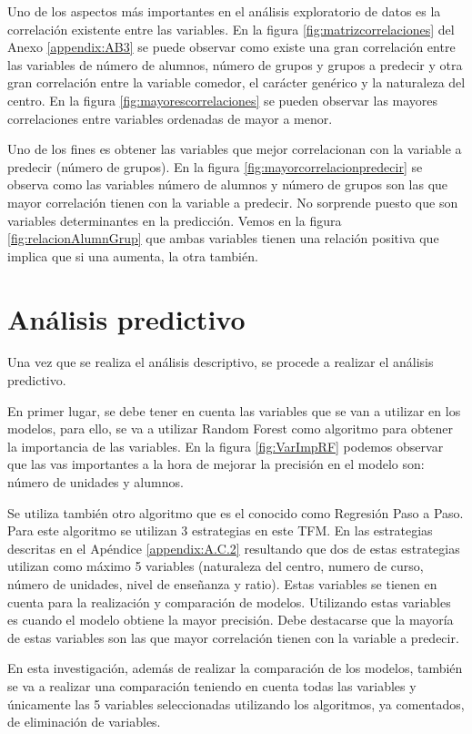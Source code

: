 Uno de los aspectos más importantes en el análisis exploratorio de datos es la correlación existente entre las variables. En la figura \ref{fig:matrizcorrelaciones} del Anexo \ref{appendix:AB3} se puede observar como existe una gran correlación entre las variables de número de alumnos, número de grupos y grupos a predecir y otra gran correlación entre la variable comedor, el carácter genérico y la naturaleza del centro. En la figura \ref{fig:mayorescorrelaciones} se pueden observar las mayores correlaciones entre variables ordenadas de mayor a menor.

Uno de los fines es obtener las variables que mejor correlacionan con la variable a predecir (número de grupos). En la figura \ref{fig:mayorcorrelacionpredecir} se observa como las variables número de alumnos y número de grupos son las que mayor correlación tienen con la variable a predecir. No sorprende puesto que son variables determinantes en la predicción. Vemos en la figura \ref{fig:relacionAlumnGrup} que ambas variables tienen una relación positiva que implica que si una aumenta, la otra también.


\section{Análisis predictivo}
Una vez que se realiza el análisis descriptivo, se procede a realizar el análisis predictivo.

En primer lugar, se debe tener en cuenta las variables que se van a utilizar en los modelos, para ello, se va a utilizar Random Forest como algoritmo para obtener la importancia de las variables. En la figura \ref{fig:VarImpRF} podemos observar que las vas importantes a la hora de mejorar la precisión en el modelo son: número de unidades y alumnos.

Se utiliza también otro algoritmo que es el conocido como Regresión Paso a Paso. Para este algoritmo se utilizan 3 estrategias en este TFM. En las estrategias descritas en el Apéndice \ref{appendix:A.C.2} resultando que dos de estas estrategias utilizan como máximo 5 variables (naturaleza del centro, numero de curso, número de unidades, nivel de enseñanza y ratio). Estas variables se tienen en cuenta para la realización y comparación de modelos. Utilizando estas variables es cuando el modelo obtiene la mayor precisión. Debe destacarse que la mayoría de estas variables son las que mayor correlación tienen con la variable a predecir.

En esta investigación, además de realizar la comparación de los modelos, también se va a realizar una comparación teniendo en cuenta todas las variables y únicamente las 5 variables seleccionadas utilizando los algoritmos, ya comentados, de eliminación de variables.

